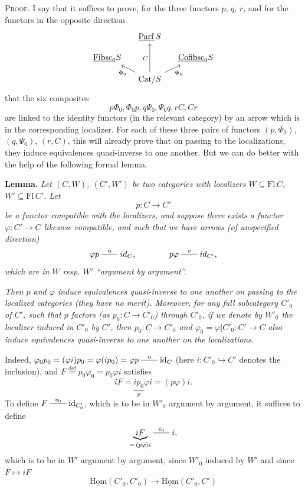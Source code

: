 \documentclass[11pt]{article}
\newcommand{\printedpage}[1]{\marginpar{\footnotesize p.~#1}}
\newcommand{\msp}[1]{\marginpar{\footnotesize [#1]}}
\newcommand{\ul}[1]{\underline{\mathrm{#1}}}
\newcommand{\xline}[1]{\mathrel{\overset{#1}{\rule[0.6ex]{2em}{0.4pt}}}}
\begin{document}
\msp{page 11}
\textsc{Proof}. I say that it suffices to prove, for the three functors $p$, $q$, $r$, and for the functors in the opposite direction
\printedpage{8}
\[
\begin{tikzcd}[column sep=small, row sep=small]
 & \ul{Parf}\,S & \\
\ul{Fibsc}_0S & & \ul{Cofibsc}_0S \\
 & \mathrm{Cat}/S \arrow[uu, "C"] \arrow[ul, "\Phi_0"] \arrow[ur, "\Psi_0"'] &
\end{tikzcd}
\]
that the six composites
\[
p\Phi_0, \Phi_0p, q\Psi_0, \Psi_0q, rC, Cr
\]
are linked to the identity functors (in the relevant category) by an arrow which is in the corresponding localizer. For each of these three pairs of functors $(p,\Phi_0)$, $(q,\Psi_0)$, $(r,C)$, this will already prove that on passing to the localizations, they induce equivalences quasi-inverse to one another. But we can do better with the help of the following formal lemma.

\textbf{Lemma.} \textit{Let $(C,W)$, $(C',W')$ be two categories with localizers $W \subseteq \mathrm{Fl}\,C$, $W' \subseteq \mathrm{Fl}\,C'$. Let}
\[
p : C \longrightarrow C'
\]
\textit{be a functor compatible with the localizers, and suppose there exists a functor $\varphi : C' \longrightarrow C$ likewise compatible, and such that we have arrows (of unspecified direction)}
\[
\varphi p \xline{u} id_C, \qquad\qquad p\varphi \xline{v} id_{C'},
\]
\textit{which are in $W$ resp. $W'$ ``argument by argument''.}

\msp{page 12}
\textit{Then $p$ and $\varphi$ induce equivalences quasi-inverse to one another on passing to the localized categories (they have no merit). Moreover, for any full subcategory $C'_0$ of $C'$, such that $p$ factors (as $p_0 : C \longrightarrow C'_0$) through $C'_0$, if we denote by $W'_0$ the localizer induced in $C'_0$ by $C'$, then $p_0 : C \longrightarrow C'_0$ and $\varphi_0 = \varphi|C'_0 : C' \longrightarrow C$} \textit{also induce equivalences quasi-inverse to one another on the localizations.} %

Indeed, $\varphi_0p_0 = (\varphi i)p_0 = \varphi(ip_0) = \varphi p \xline{u} \mathrm{id}_C$ (here $i : C'_0 \hookrightarrow C'$ denotes the inclusion), and $F \overset{\text{def}}{=} p_0\varphi_0 = p_0\varphi i$ satisfies
\[
iF = \underbrace{ip_0}_{p}\varphi i = (p\varphi)i.
\]
To define $F \xline{v_0} \mathrm{id}_{C'_0}$, which is to be in $W'_0$ argument by argument,
\msp{page 13}
it suffices to define
\[
\underbrace{iF}_{=\,(p\varphi)i} \xline{\bar v_0} i,
\]
which is to be in $W'$ argument by argument, since $W'_0$ induced by $W'$ and since $F \longmapsto iF$
\[
\ul{Hom}(C'_0,C'_0) \longrightarrow \ul{Hom}(C'_0,C')
\]
\end{document}
